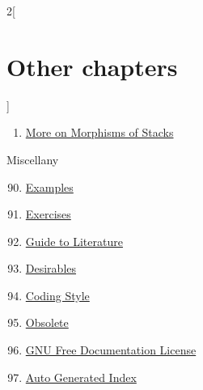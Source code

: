 \begin{multicols}{2}[\section{Other chapters}]
\begin{enumerate}
\item \hyperref[stacks-more-morphisms-section-phantom]{More on Morphisms of Stacks}
\end{enumerate}
Miscellany
\begin{enumerate}
\setcounter{enumi}{89}
\item \hyperref[examples-section-phantom]{Examples}
\item \hyperref[exercises-section-phantom]{Exercises}
\item \hyperref[guide-section-phantom]{Guide to Literature}
\item \hyperref[desirables-section-phantom]{Desirables}
\item \hyperref[coding-section-phantom]{Coding Style}
\item \hyperref[obsolete-section-phantom]{Obsolete}
\item \hyperref[fdl-section-phantom]{GNU Free Documentation License}
\item \hyperref[index-section-phantom]{Auto Generated Index}
\end{enumerate}
\end{multicols}
